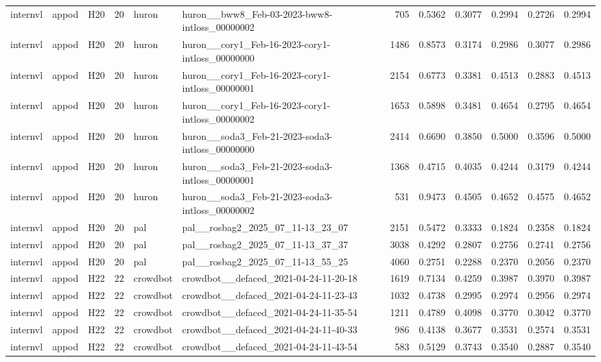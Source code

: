 \begin{table}[tbp]
\begin{tabular}{lllrllrrrrrr}
internvl & appod & H20 & 20 & huron & huron\_\_bww8\_Feb-03-2023-bww8-intloss\_00000002 & 705 & 0.5362 & 0.3077 & 0.2994 & 0.2726 & 0.2994 \\
internvl & appod & H20 & 20 & huron & huron\_\_cory1\_Feb-16-2023-cory1-intloss\_00000000 & 1486 & 0.8573 & 0.3174 & 0.2986 & 0.3077 & 0.2986 \\
internvl & appod & H20 & 20 & huron & huron\_\_cory1\_Feb-16-2023-cory1-intloss\_00000001 & 2154 & 0.6773 & 0.3381 & 0.4513 & 0.2883 & 0.4513 \\
internvl & appod & H20 & 20 & huron & huron\_\_cory1\_Feb-16-2023-cory1-intloss\_00000002 & 1653 & 0.5898 & 0.3481 & 0.4654 & 0.2795 & 0.4654 \\
internvl & appod & H20 & 20 & huron & huron\_\_soda3\_Feb-21-2023-soda3-intloss\_00000000 & 2414 & 0.6690 & 0.3850 & 0.5000 & 0.3596 & 0.5000 \\
internvl & appod & H20 & 20 & huron & huron\_\_soda3\_Feb-21-2023-soda3-intloss\_00000001 & 1368 & 0.4715 & 0.4035 & 0.4244 & 0.3179 & 0.4244 \\
internvl & appod & H20 & 20 & huron & huron\_\_soda3\_Feb-21-2023-soda3-intloss\_00000002 & 531 & 0.9473 & 0.4505 & 0.4652 & 0.4575 & 0.4652 \\
internvl & appod & H20 & 20 & pal & pal\_\_rosbag2\_2025\_07\_11-13\_23\_07 & 2151 & 0.5472 & 0.3333 & 0.1824 & 0.2358 & 0.1824 \\
internvl & appod & H20 & 20 & pal & pal\_\_rosbag2\_2025\_07\_11-13\_37\_37 & 3038 & 0.4292 & 0.2807 & 0.2756 & 0.2741 & 0.2756 \\
internvl & appod & H20 & 20 & pal & pal\_\_rosbag2\_2025\_07\_11-13\_55\_25 & 4060 & 0.2751 & 0.2288 & 0.2370 & 0.2056 & 0.2370 \\
internvl & appod & H22 & 22 & crowdbot & crowdbot\_\_defaced\_2021-04-24-11-20-18 & 1619 & 0.7134 & 0.4259 & 0.3987 & 0.3970 & 0.3987 \\
internvl & appod & H22 & 22 & crowdbot & crowdbot\_\_defaced\_2021-04-24-11-23-43 & 1032 & 0.4738 & 0.2995 & 0.2974 & 0.2956 & 0.2974 \\
internvl & appod & H22 & 22 & crowdbot & crowdbot\_\_defaced\_2021-04-24-11-35-54 & 1211 & 0.4789 & 0.4098 & 0.3770 & 0.3042 & 0.3770 \\
internvl & appod & H22 & 22 & crowdbot & crowdbot\_\_defaced\_2021-04-24-11-40-33 & 986 & 0.4138 & 0.3677 & 0.3531 & 0.2574 & 0.3531 \\
internvl & appod & H22 & 22 & crowdbot & crowdbot\_\_defaced\_2021-04-24-11-43-54 & 583 & 0.5129 & 0.3743 & 0.3540 & 0.2887 & 0.3540 \\

\end{tabular}
\end{table}
